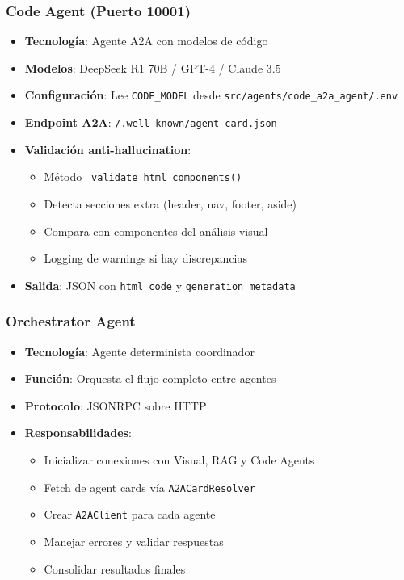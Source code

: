 \documentclass[12pt,a4paper]{article}
\begin{document}
\subsubsection{Code Agent (Puerto 10001)}
\begin{itemize}
    \item \textbf{Tecnología}: Agente A2A con modelos de código
    \item \textbf{Modelos}: DeepSeek R1 70B / GPT-4 / Claude 3.5
    \item \textbf{Configuración}: Lee \texttt{CODE\_MODEL} desde \texttt{src/agents/code\_a2a\_agent/.env}
    \item \textbf{Endpoint A2A}: \texttt{/.well-known/agent-card.json}
    \item \textbf{Validación anti-hallucination}:
    \begin{itemize}
        \item Método \texttt{\_validate\_html\_components()}
        \item Detecta secciones extra (header, nav, footer, aside)
        \item Compara con componentes del análisis visual
        \item Logging de warnings si hay discrepancias
    \end{itemize}
    \item \textbf{Salida}: JSON con \texttt{html\_code} y \texttt{generation\_metadata}
\end{itemize}

\subsubsection{Orchestrator Agent}
\begin{itemize}
    \item \textbf{Tecnología}: Agente determinista coordinador
    \item \textbf{Función}: Orquesta el flujo completo entre agentes
    \item \textbf{Protocolo}: JSONRPC sobre HTTP
    \item \textbf{Responsabilidades}:
    \begin{itemize}
        \item Inicializar conexiones con Visual, RAG y Code Agents
        \item Fetch de agent cards vía \texttt{A2ACardResolver}
        \item Crear \texttt{A2AClient} para cada agente
        \item Manejar errores y validar respuestas
        \item Consolidar resultados finales
    \end{itemize}
\end{itemize}
\end{document}
